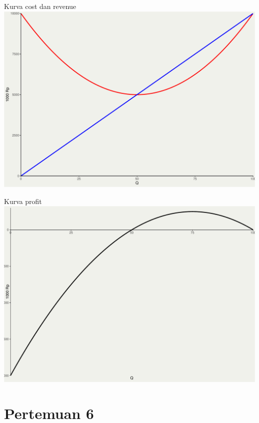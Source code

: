 \documentclass[
  ignorenonframetext,
]{beamer}
\begin{document}
\begin{frame}{Kurva cost dan revenue}
\label{kurva-cost-dan-revenue}
\includegraphics{index_files/figure-beamer/unnamed-chunk-9-1.pdf}
\end{frame}

\begin{frame}{Kurva profit}
\label{kurva-profit}
\includegraphics{index_files/figure-beamer/unnamed-chunk-10-1.pdf}
\end{frame}

\section{Pertemuan 6}\label{pertemuan-6}
\end{document}
